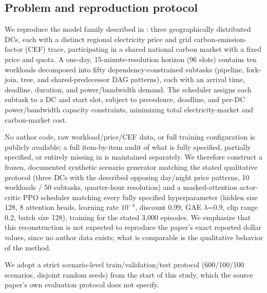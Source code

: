 \documentclass[journal]{IEEEtran}
\begin{document}
\subsection{Problem and reproduction protocol}
We reproduce the model family described in \cite{sourcepaper}: three geographically distributed DCs, each with a distinct regional electricity price and grid carbon-emission-factor (CEF) trace, participating in a shared national carbon market with a fixed price and quota. A one-day, 15-minute-resolution horizon (96 slots) contains ten workloads decomposed into fifty dependency-constrained subtasks (pipeline, fork-join, tree, and shared-predecessor DAG patterns), each with an arrival time, deadline, duration, and power/bandwidth demand. The scheduler assigns each subtask to a DC and start slot, subject to precedence, deadline, and per-DC power/bandwidth capacity constraints, minimizing total electricity-market and carbon-market cost.

No author code, raw workload/price/CEF data, or full training configuration is publicly available; a full item-by-item audit of what is fully specified, partially specified, or entirely missing in \cite{sourcepaper} is maintained separately. We therefore construct a frozen, documented synthetic scenario generator matching the stated qualitative protocol (three DCs with the described opposing day/night price patterns, 10 workloads / 50 subtasks, quarter-hour resolution) and a masked-attention actor-critic PPO scheduler matching every fully specified hyperparameter (hidden size 128, 8 attention heads, learning rate $10^{-4}$, discount 0.99, GAE $\lambda$=0.9, clip range 0.2, batch size 128), training for the stated 3{,}000 episodes. We emphasize that this reconstruction is not expected to reproduce the paper's exact reported dollar values, since no author data exists; what is comparable is the qualitative behavior of the method.

We adopt a strict scenario-level train/validation/test protocol (600/100/100 scenarios, disjoint random seeds) from the start of this study, which the source paper's own evaluation protocol does not specify.
\end{document}
